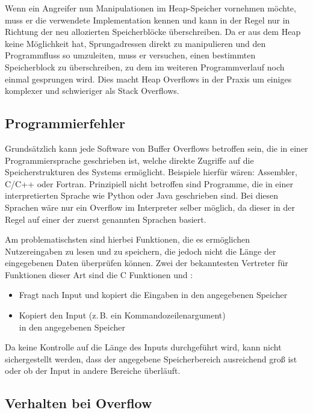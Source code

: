 Wenn ein Angreifer nun Manipulationen im Heap-Speicher vornehmen möchte, muss er die verwendete Implementation kennen 
und kann in der Regel nur in Richtung der neu allozierten Speicherblöcke überschreiben. Da er aus dem Heap keine Möglichkeit 
hat, Sprungadressen direkt zu manipulieren und den Programmfluss so umzuleiten, muss er versuchen, einen bestimmten 
Speicherblock zu überschreiben, zu dem im weiteren Programmverlauf noch einmal gesprungen wird. Dies macht Heap Overflows 
in der Praxis um einiges komplexer und schwieriger als Stack Overflows.

\subsection{Programmierfehler}
Grundsätzlich kann jede Software von Buffer Overflows betroffen sein, die in einer Programmiersprache geschrieben ist, 
welche direkte Zugriffe auf die Speicherstrukturen des Systems ermöglicht. Beispiele hierfür wären: Assembler, C/C++ oder 
Fortran. Prinzipiell nicht betroffen sind Programme, die in einer interpretierten Sprache wie Python oder Java geschrieben 
sind. Bei diesen Sprachen wäre nur ein Overflow im Interpreter selber möglich, da dieser in der Regel auf einer der zuerst 
genannten Sprachen basiert.

Am problematischsten sind hierbei Funktionen, die es ermöglichen Nutzereingaben zu lesen und zu speichern,
die jedoch nicht die Länge der eingegebenen Daten überprüfen können. Zwei der bekanntesten Vertreter für Funktionen
dieser Art sind die C Funktionen  und :
\begin{itemize}
    \item {} Fragt nach Input und kopiert die Eingaben in den angegebenen Speicher
    \item {} Kopiert den Input (z.\,B. ein Kommandozeilenargument)\\ in den angegebenen Speicher
\end{itemize}
Da keine Kontrolle auf die Länge des Inputs durchgeführt wird, kann nicht sichergestellt werden,
dass der angegebene Speicherbereich ausreichend groß ist oder ob der Input in andere Bereiche überläuft.

\subsection{Verhalten bei Overflow}


